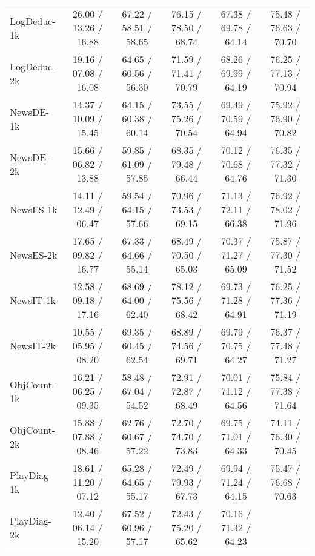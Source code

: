 \begin{table*}[h]
\begin{tabular}{lccccc}
LogDeduc-1k& 
26.00 / 13.26 / 16.88
& 67.22 / 58.51 / 58.65
& 76.15 / 78.50 / 68.74
& 67.38 / 69.78 / 64.14
& 
75.48 / 76.63 / 70.70
\\

LogDeduc-2k& 
19.16 / 07.08 / 16.08
& 64.65 / 60.56 / 56.30
& 71.59 / 71.41 / 70.79
& 
68.26 / 69.99 / 64.19
& 



76.25 / 77.13 / 70.94
\\
NewsDE-1k& 14.37 / 10.09 / 15.45
& 64.15 / 60.38 / 60.14
& 73.55 / 75.26 / 70.54
& 69.49 / 70.59 / 64.94
& 75.92 / 76.90 / 70.82
\\

NewsDE-2k& 
15.66 / 06.82 / 13.88
& 59.85 / 61.09 / 57.85
& 68.35 / 79.48 / 66.44
& 
70.12 / 70.68 / 64.76
& 


76.35 / 77.32 / 71.30
\\

NewsES-1k& 
14.11 / 12.49 / 06.47
& 59.54 / 64.15 / 57.66
& 70.96 / 73.53 / 69.15
& 71.13 / 72.11 / 66.38
& 
76.92 / 78.02 / 71.96
\\

NewsES-2k& 
17.65 / 09.82 / 16.77
& 67.33 / 64.66 / 55.14
& 68.49 / 70.50 / 65.03
& 
70.37 / 71.27 / 65.09
& 



75.87 / 77.30 / 71.52
\\
NewsIT-1k& 12.58 / 09.18 / 17.16
& 68.69 / 64.00 / 62.40
& 78.12 / 75.56 / 68.42
& 69.73 / 71.28 / 64.91
& 76.25 / 77.36 / 71.19
\\

NewsIT-2k& 
10.55 / 05.95 / 08.20
& 69.35 / 60.45 / 62.54
& 68.89 / 74.56 / 69.71
& 
69.79 / 70.75 / 64.27
& 


76.37 / 77.48 / 71.27
\\

ObjCount-1k& 
16.21 / 06.25 / 09.35
& 58.48 / 67.04 / 54.52
& 72.91 / 72.87 / 68.49
& 70.01 / 71.12 / 64.56
& 
75.84 / 77.38 / 71.64
\\

ObjCount-2k& 
15.88 / 07.88 / 08.46
& 62.76 / 60.67 / 57.22
& 72.70 / 74.70 / 73.83
& 
69.75 / 71.01 / 64.33
& 



74.11 / 76.30 / 70.45
\\
PlayDiag-1k& 18.61 / 11.20 / 07.12
& 65.28 / 64.65 / 55.17
& 72.49 / 79.93 / 67.73
& 69.94 / 71.24 / 64.15
& 75.47 / 76.68 / 70.63
\\

PlayDiag-2k& 
12.40 / 06.14 / 15.20
& 67.52 / 60.96 / 57.17
& 72.43 / 75.20 / 65.62
& 
70.16 / 71.32 / 64.23
& 



\end{tabular}
\end{table*}
